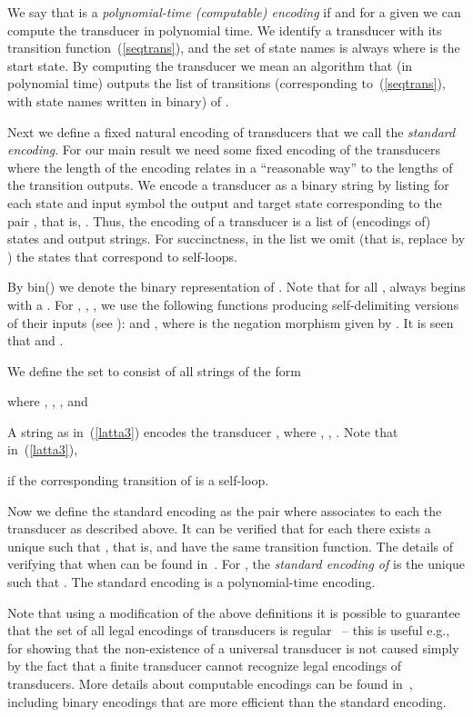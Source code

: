 \documentclass[copyright]{eptcs}
\begin{document}
We say that  is a {\em polynomial-time
 (computable) encoding\/} if   
and for a given  we can compute 
 the transducer 
in polynomial time.
We identify a transducer   with
its transition function~(\ref{seqtrans}), and the
set of state names
is always  where  is the start state.
By computing the transducer  we mean an
algorithm that (in polynomial time) outputs
the list of transitions (corresponding to~(\ref{seqtrans}),
with state names  written in binary) of
.

Next we define a fixed natural  encoding  of transducers
that we call the {\em standard encoding}. For our main 
result we need some fixed encoding of the transducers where the
\label{statesize}
length of the encoding relates in a ``reasonable way'' to the
lengths  of the transition outputs.
We encode a transducer as a binary string by listing for each state
 and input symbol  the output and target
state corresponding to the pair , that is, .
Thus, the encoding of a transducer is a list of (encodings
of) states and output strings. For succinctness,
in the list
we omit (that is,
replace by ) the states that correspond to self-loops.

By bin() we denote the
binary representation of . Note that for all ,
 always  begins with
a .
For ,
, , we use the following functions producing self-delimiting versions of
their inputs
(see \cite{cris}):
 and , where
 is the negation morphism given
by  . It is seen that
 and
.

We define the set   to consist of
all strings of the form

where , ,
,
and


A string  as in~(\ref{latta3}) encodes
the transducer ,
where
,
, .
Note that in~(\ref{latta3}),

if the corresponding transition of  is a self-loop.


Now we define the
standard encoding  as the pair  where  associates
to each  the transducer 
 as described above.
It can be verified  that for each
 there exists a unique
 such that ,
that is,  and  have the same
transition function.
The details of verifying that  when  can
be found in~\cite{CSR}. For  , 
the {\em standard encoding of\/}  is the unique
 such that .
The standard encoding   is a
polynomial-time encoding. 




Note that using a modification of the above definitions
it is possible
to guarantee that the set of all legal encodings of transducers
is regular~\cite{CSR} -- this is useful e.g.,
for  showing that the
non-existence of a universal transducer is not caused simply
by the fact that a finite transducer cannot recognize legal
encodings of transducers. More details about
computable encodings can be found in~\cite{CSR}, including
 binary encodings that are more efficient
than the standard encoding.
\end{document}
